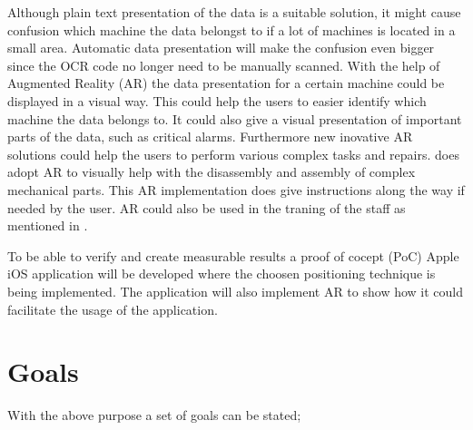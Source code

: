 \documentclass[12pt]{article}
\begin{document}
Although plain text presentation of the data is a suitable solution, it might cause confusion which machine the data belongst to if a lot of machines is located in a small area.
Automatic data presentation will make the confusion even bigger since the OCR code no longer need to be manually scanned.
With the help of Augmented Reality (AR) the data presentation for a certain machine could be displayed in a visual way.
This could help the users to easier identify which machine the data belongs to.
It could also give a visual presentation of important parts of the data, such as critical alarms.
Furthermore new inovative AR solutions could help the users to perform various complex tasks and repairs.
\cite{SystematicDesignMethod2020} does adopt AR to visually help with the disassembly and assembly of complex mechanical parts.
This AR implementation does give instructions along the way if needed by the user.
AR could also be used in the traning of the staff as mentioned in \cite{AdoptingAugmentedReality2020}.

\bigskip

To be able to verify and create measurable results a proof of cocept (PoC) Apple iOS application will be developed where the choosen positioning technique is being implemented.
The application will also implement AR to show how it could facilitate the usage of the application.

\section{Goals}
With the above purpose a set of goals can be stated;
\end{document}
